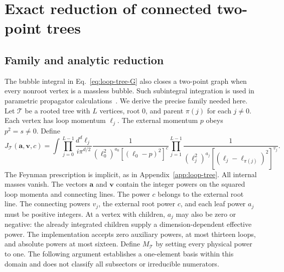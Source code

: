 \section{Exact reduction of connected two-point trees}
\label{app:prop-tree}
\subsection{Family and analytic reduction}
The bubble integral in Eq.~\eqref{eq:loop-tree-G} also closes a two-point graph when every nonroot vertex is a massless bubble. Such subintegral integration is used in parametric propagator calculations~\cite{Ruijl2017Forcer}. We derive the precise family needed here. Let $\mathcal T$ be a rooted tree with $L$ vertices, root $0$, and parent $\pi(j)$ for each $j\ne0$. Each vertex has loop momentum $\ell_j$. The external momentum $p$ obeys $p^2=s\ne0$. Define
\begin{equation}
 J_{\mathcal T}(\boldsymbol a,\boldsymbol v,c)=
 \int\prod_{j=0}^{L-1}\frac{d^d\ell_j}{i\pi^{d/2}}
 \frac{1}{(\ell_0^2)^{a_0}[(\ell_0-p)^2]^c}
 \prod_{j=1}^{L-1}
 \frac{1}{(\ell_j^2)^{a_j}[(\ell_j-\ell_{\pi(j)})^2]^{v_j}}.
 \label{eq:prop-tree-family}
\end{equation}
The Feynman prescription is implicit, as in Appendix~\ref{app:loop-tree}. All internal masses vanish. The vectors $\boldsymbol a$ and $\boldsymbol v$ contain the integer powers on the squared loop momenta and connecting lines. The power $c$ belongs to the external root line. The connecting powers $v_j$, the external root power $c$, and each leaf power $a_j$ must be positive integers. At a vertex with children, $a_j$ may also be zero or negative: the already integrated children supply a dimension-dependent effective power. The implementation accepts zero auxiliary powers, at most thirteen loops, and absolute powers at most sixteen. Define $M_{\mathcal T}$ by setting every physical power to one. The following argument establishes a one-element basis within this domain and does not classify all subsectors or irreducible numerators.

